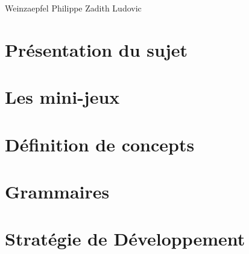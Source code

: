\documentclass[a4paper,10pt]{article}
\begin{document}
\vspace{0.2cm}
\hspace{2cm} Weinzaepfel Philippe \hspace{1.6cm} Zadith Ludovic

\vspace{5cm}

\normalsize
\begin{abstract}
 Ce document présente la partie analyse du projet de master 1 intitulé "Plateforme de création de mini-jeux 3D sur le WEB".
 Il consiste à concevoir et à développer un outil auteur pour créer des contenus 3D très interactifs dans les pages internet.
 En particulier, il s'agit de définir un langage permettant de générer le code de mini-jeux affichés en 3D.
 Le rapport est divisé en 4 parties : la partie \ref{sec:sujet} présente de manière plus précise le sujet.
 La seconde utilise l'exemple de différents mini-jeux pour appuyer l'analyse du contenu d'un mini-jeu.
 La partie \ref{sec:concept} définit les concepts récurrents dans l'univers des jeux.
 Enfin, la dernière partie présente les grammaires proposées.
\end{abstract}

\clearpage

\vspace{0.5cm}
\section{Présentation du sujet}
\label{sec:sujet}
\vspace{0.5cm}
 

\vspace{0.5cm}
\section{Les mini-jeux}
\label{sec:minijeux}
\vspace{0.5cm}


\section{Définition de concepts}
\label{sec:concept}


\section{Grammaires}
\label{sec:grammaire}


\section{Stratégie de Développement}
\label{sec:strategie}

\end{document}
